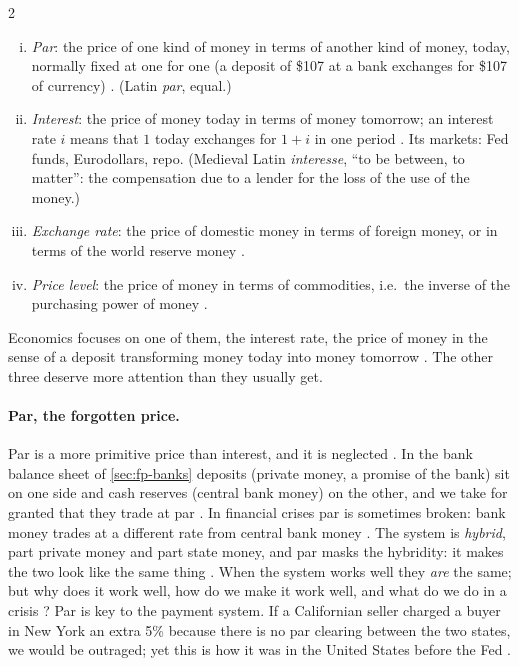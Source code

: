 \begin{paracol}{2}
\begin{definition}\label{def:fp-four}
\leavevmode
\begin{enumerate}[(i)]
  \item \emph{Par}: the price of one kind of money in terms of another kind of money, today, normally fixed at one
        for one (a deposit of \$107 at a bank exchanges for \$107 of currency) .
        (Latin \emph{par}, equal.)
  \item \emph{Interest}: the price of money today in terms of money tomorrow; an interest rate $i$ means that $1$
        today exchanges for $1+i$ in one period . Its markets: Fed funds, Eurodollars, repo.
        (Medieval Latin \emph{interesse}, ``to be between, to matter'': the compensation due to a lender for the
        loss of the use of the money.)
  \item \emph{Exchange rate}: the price of domestic money in terms of foreign money, or in terms of the world reserve
        money .
  \item \emph{Price level}: the price of money in terms of commodities, i.e.\ the inverse of the purchasing power of
        money .
\end{enumerate}
\end{definition}

Economics focuses on one of them, the interest rate, the price of money in the sense of a deposit transforming money
today into money tomorrow . The other three deserve more attention than they usually get.

\paragraph{Par, the forgotten price.} Par is a more primitive price than interest, and it is neglected
. In the bank balance sheet of \cref{sec:fp-banks} deposits (private money, a promise of the bank) sit
on one side and cash reserves (central bank money) on the other, and we take for granted that they trade at par
. In financial crises par is sometimes broken: bank money trades at a different rate from central bank
money . The system is \emph{hybrid}, part private money and part state money, and par masks the
hybridity: it makes the two look like the same thing . When the system works well they \emph{are} the
same; but why does it work well, how do we make it work well, and what do we do in a crisis ? Par is
key to the payment system. If a Californian seller charged a buyer in New York an extra 5\% because there is no par
clearing between the two states, we would be outraged; yet this is how it was in the United States before the Fed
.


\end{paracol}

